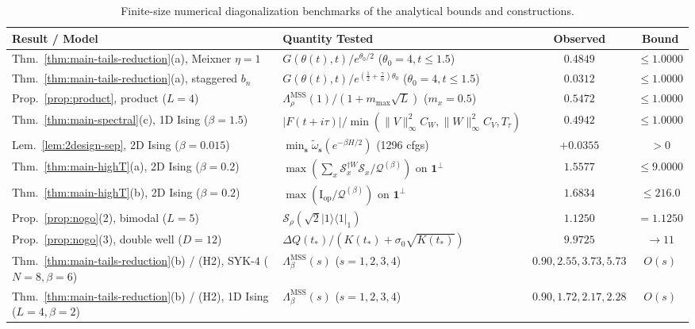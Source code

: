 \documentclass[11pt,a4paper]{article}
\numberwithin{equation}{section}
\theoremstyle{plain}
\theoremstyle{definition}
\newcommand{\MSS}{\mathrm{MSS}}
\begin{document}
\begin{table}[!htbp]
\centering
\footnotesize
\begin{tabularx}{\linewidth}{@{}>{\raggedright\arraybackslash}p{4.4cm} >{\raggedright\arraybackslash}X c c@{}}
\toprule
\textbf{Result / Model} & \textbf{Quantity Tested} & \textbf{Observed} & \textbf{Bound} \\
\midrule
Thm.~\ref{thm:main-tails-reduction}(a), Meixner $\eta=1$ & $G(\theta(t),t)/e^{\theta_0/2}$ ($\theta_0=4, t\le 1.5$) & $0.4849$ & $\le 1.0000$ \\
Thm.~\ref{thm:main-tails-reduction}(a), staggered $b_n$ & $G(\theta(t),t)/e^{(\frac{1}{2}+\frac{\gamma}{\alpha})\theta_0}$ ($\theta_0=4, t\le 1.5$) & $0.0312$ & $\le 1.0000$ \\
Prop.~\ref{prop:product}, product ($L=4$) & $\Lambda_\rho^{\MSS}(1)/(1 + m_{\max}\sqrt{L})$ ($m_x=0.5$) & $0.5472$ & $\le 1.0000$ \\
Thm.~\ref{thm:main-spectral}(c), 1D Ising ($\beta=1.5$) & $|F(t+i\tau)|/\min(\|V\|_\infty^2 C_W,\|W\|_\infty^2 C_V,T_\tau)$ & $0.4942$ & $\le 1.0000$ \\
Lem.~\ref{lem:2design-sep}, 2D Ising ($\beta=0.015$) & $\min_{\mathbf{s}}\widetilde{\omega}_{\mathbf{s}}(e^{-\beta H/2})$ (1296 cfgs) & $+0.0355$ & $> 0$ \\
Thm.~\ref{thm:main-highT}(a), 2D Ising ($\beta=0.2$) & $\max(\sum_x \mathcal{S}_x^{\dagger W}\mathcal{S}_x / \mathcal{Q}^{(\beta)})$ on $\mathbf{1}^\perp$ & $1.5577$ & $\le 9.0000$ \\
Thm.~\ref{thm:main-highT}(b), 2D Ising ($\beta=0.2$) & $\max(\mathrm{I}_{\mathrm{op}}/\mathcal{Q}^{(\beta)})$ on $\mathbf{1}^\perp$ & $1.6834$ & $\le 216.0$ \\
Prop.~\ref{prop:nogo}(2), bimodal ($L=5$) & $\mathcal{S}_\rho(\sqrt{2}|1\rangle\langle 1|_1)$ & $1.1250$ & $= 1.1250$ \\
Prop.~\ref{prop:nogo}(3), double well ($D=12$) & $\Delta Q(t_*)/(K(t_*)+\sigma_0\sqrt{K(t_*)})$ & $9.9725$ & $\to 11$ \\
Thm.~\ref{thm:main-tails-reduction}(b) / (H2), SYK-$4$ ($N=8,\beta=6$) & $\Lambda_\beta^{\MSS}(s)$ ($s=1,2,3,4$) & $0.90, 2.55, 3.73, 5.73$ & $O(s)$ \\
Thm.~\ref{thm:main-tails-reduction}(b) / (H2), 1D Ising ($L=4,\beta=2$) & $\Lambda_\beta^{\MSS}(s)$ ($s=1,2,3,4$) & $0.90, 1.72, 2.17, 2.28$ & $O(s)$ \\
\bottomrule
\end{tabularx}
\caption{Finite-size numerical diagonalization benchmarks of the analytical bounds and constructions.}\label{tab:num}
\end{table}
\end{document}
